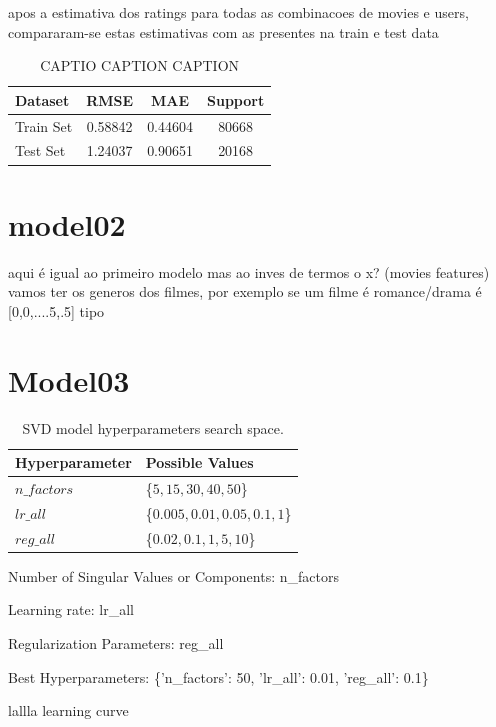 \documentclass[conference]{IEEEtran}
\begin{document}
apos a estimativa dos ratings para todas as combinacoes de movies e users, compararam-se estas estimativas com as presentes na train e test data

\begin{table}[H]
\centering
\caption{CAPTIO CAPTION CAPTION}
\label{tab:model01_results}
\begin{tabular}{lccc}
\toprule
\textbf{Dataset} & \textbf{RMSE} & \textbf{MAE} & \textbf{Support} \\
\midrule
Train Set & 0.58842 & 0.44604 & 80668 \\
Test Set & 1.24037 & 0.90651 & 20168 \\
\bottomrule
\end{tabular}
\end{table}

\section{model02}

aqui é igual ao primeiro modelo mas ao inves de termos o x? (movies features) vamos ter os generos dos filmes, por exemplo se um filme é romance/drama é [0,0,....5,.5] tipo


\section{Model03}

\begin{table}[H]
\centering
\caption{SVD model hyperparameters search space.}
\label{parametrosSVD}
\begin{tabular}{ll}
\toprule
\textbf{Hyperparameter} & \textbf{Possible Values} \\
\midrule
$n\_factors$ & \{$5,15,30,40,50$\} \\ 
$lr\_all$ & \{$0.005, 0.01, 0.05, 0.1, 1$\} \\ 
$reg\_all$ & \{$0.02,0.1,1,5,10$\} \\ 
\bottomrule
\end{tabular}
\end{table}


Number of Singular Values or Components: n\_factors

Learning rate: lr\_all

Regularization Parameters: reg\_all

Best Hyperparameters: \{'n\_factors': 50, 'lr\_all': 0.01, 'reg\_all': 0.1\}

lallla learning curve
\end{document}
